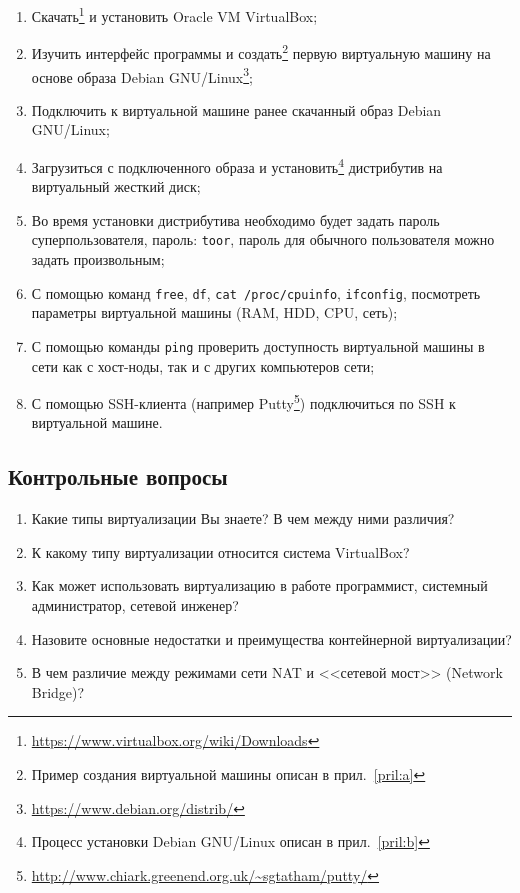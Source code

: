 \begin{enumerate}
    \item Скачать\footnote{\url{https://www.virtualbox.org/wiki/Downloads}} и установить Oracle VM VirtualBox;
    \item Изучить интерфейс программы и создать\footnote{Пример создания виртуальной машины описан в прил.~\ref{pril:a}} первую виртуальную машину на основе образа Debian GNU/Linux\footnote{\url{https://www.debian.org/distrib/}};
    \item Подключить к виртуальной машине ранее скачанный образ Debian GNU/Linux;
    \item Загрузиться с подключенного образа и установить\footnote{Процесс установки Debian GNU/Linux описан в прил.~\ref{pril:b}} дистрибутив на виртуальный жесткий диск;
    \item Во время установки дистрибутива необходимо будет задать пароль суперпользователя, пароль: \texttt{toor}, пароль для обычного пользователя можно задать произвольным;
    \item С помощью команд \texttt{free}, \texttt{df}, \texttt{cat /proc/cpuinfo}, \texttt{ifconfig}, посмотреть параметры виртуальной машины (RAM, HDD, CPU, сеть);
    \item С помощью команды \texttt{ping} проверить доступность виртуальной машины в сети как с хост-ноды, так и с других компьютеров сети;
    \item С помощью SSH-клиента (например Putty\footnote{\url{http://www.chiark.greenend.org.uk/~sgtatham/putty/}}) подключиться по SSH к виртуальной машине.
\end{enumerate}

\subsection{Контрольные вопросы}
\begin{enumerate}
    \item Какие типы виртуализации Вы знаете? В чем между ними различия?
    \item К какому типу виртуализации относится система VirtualBox?
    \item Как может использовать виртуализацию в работе программист, системный администратор, сетевой инженер?
    \item Назовите основные недостатки и преимущества контейнерной виртуализации?
    \item В чем различие между режимами сети NAT и <<сетевой мост>> (Network Bridge)?
\end{enumerate}

\clearpage
